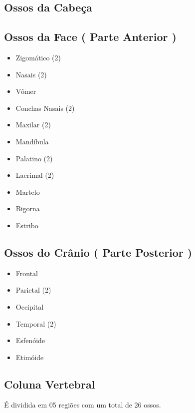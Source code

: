 \documentclass[
]{book}
\providecommand{\tightlist}{%
  \setlength{\itemsep}{0pt}\setlength{\parskip}{0pt}}
\begin{document}
\hypertarget{ossos-da-cabeuxe7a}{%
\subsection{Ossos da Cabeça}\label{ossos-da-cabeuxe7a}}

\hypertarget{ossos-da-face-parte-anterior}{%
\subsection{Ossos da Face ( Parte Anterior )}\label{ossos-da-face-parte-anterior}}

\begin{itemize}
\tightlist
\item
  Zigomático (2)
\item
  Nasais (2)
\item
  Vômer
\item
  Conchas Nasais (2)
\item
  Maxilar (2)
\item
  Mandíbula
\item
  Palatino (2)
\item
  Lacrimal (2)
\item
  Martelo
\item
  Bigorna
\item
  Estribo
\end{itemize}

\hypertarget{ossos-do-cruxe2nio-parte-posterior}{%
\subsection{Ossos do Crânio ( Parte Posterior )}\label{ossos-do-cruxe2nio-parte-posterior}}

\begin{itemize}
\tightlist
\item
  Frontal
\item
  Parietal (2)
\item
  Occipital
\item
  Temporal (2)
\item
  Esfenóide
\item
  Etimóide
\end{itemize}

\hypertarget{coluna-vertebral}{%
\subsection{Coluna Vertebral}\label{coluna-vertebral}}

É dividida em 05 regiões com um total de 26 ossos.
\end{document}
